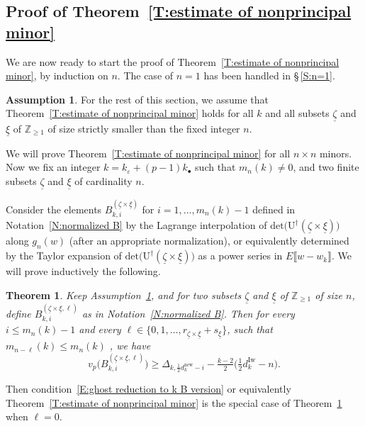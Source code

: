 \documentclass[12pt]{amsart}
\newtheorem{theorem}[subsection]{Theorem}
\theoremstyle{definition}
\newtheorem{assumption}[subsection]{Assumption}
\numberwithin{equation}{subsection}
\def\ZZ{\mathbb{Z}}
\def\rmU{\mathrm{U}}
\newcommand{\new}{\mathrm{new}}
\newcommand{\Iw}{\mathrm{Iw}}
\renewcommand{\det}{\mathrm{det}}
\begin{document}
\subsection{Proof of Theorem~\ref{T:estimate of nonprincipal minor}}
\label{S:proof of estimate on Axii}
We are now ready to start the proof of Theorem~\ref{T:estimate of nonprincipal minor}, by induction on $n$. The case of $n=1$ has been handled in \S\,\ref{S:n=1}.

\begin{assumption}\label{assumtpion: inductive assumption on non principal minors}
For the rest of this section, we assume that Theorem~\ref{T:estimate of nonprincipal minor} holds for all $k$ and all subsets $\underline \zeta$ and $\underline \xi$ of $\ZZ_{\geq 1}$ of size strictly smaller than  the fixed integer $n$.
\end{assumption}

We will prove Theorem~\ref{T:estimate of nonprincipal minor} for all $n\times n$ minors.
Now we fix an integer $k = k_\varepsilon + (p-1)k_\bullet$ such that $m_n(k) \neq 0$, and two finite subsets $\underline \zeta$ and $\underline \xi$ of cardinality $n$.

Consider the elements $B^{(\underline \zeta \times \underline \xi)}_{k,i}$ for $i=1, \dots, m_n(k)-1$ defined in Notation~\ref{N:normalized B} by the Lagrange interpolation of $\det\big(\rmU^\dagger(\underline \zeta \times \underline \xi)\big)$ along $g_n(w)$ (after an appropriate normalization), or equivalently determined by the Taylor expansion of $\det\big(\rmU^\dagger(\underline \zeta \times \underline \xi)\big)$ as a power series in $E\llbracket w-w_k\rrbracket$. We will prove inductively the following.

\begin{theorem}
\label{T:stronger estimate} 
Keep Assumption~\ref{assumtpion: inductive assumption on non principal minors}, and for two subsets $\underline \zeta$ and $\underline \xi$ of $\ZZ_{\geq 1}$ of size $n$,  define $B_{k,i}^{(\underline \zeta\times \underline \xi, \ell)}$ as in Notation~\ref{N:normalized B}. 
Then for every $i \leq m_n(k)-1$ and every $\ell \in \big\{0,1, \dots,r_{\underline \zeta \times \underline \xi}+s_{\underline \xi}\big\}$,
such that $m_{n-\ell}(k)\leq m_n(k)$ ,
we have
\begin{equation}
\label{E:generalization of estimate of Axii}
v_p\big(B_{k,i}^{(\underline \zeta \times \underline \xi, \ell)}\big ) \geq  \Delta_{k, \frac 12d_k^\new-i} - \tfrac{k-2}2 \big(\tfrac 12 d_k^\Iw-n\big).
\end{equation}
\end{theorem}
Then condition~\eqref{E:ghost reduction to k B version} or equivalently Theorem~\ref{T:estimate of nonprincipal minor} is the special case of Theorem~\ref{T:stronger estimate} when $\ell=0$.
\end{document}

